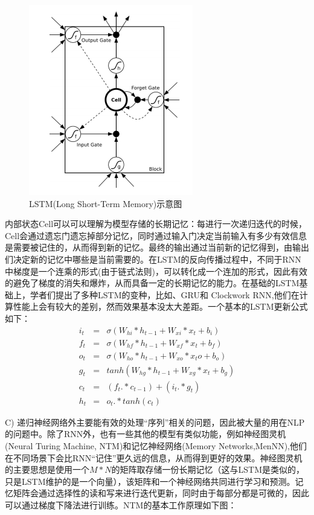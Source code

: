 \begin{figure}[h]
	\centering
	\includegraphics[width=0.3\linewidth]{"fig/LSTM"}
	\caption{LSTM(Long Short-Term Memory)示意图}
	\label{fig:LSTM}
\end{figure}

内部状态Cell可以可以理解为模型存储的长期记忆：每进行一次递归迭代的时候，Cell会通过遗忘门遗忘掉部分记忆，同时通过输入门决定当前输入有多少有效信息是需要被记住的，从而得到新的记忆。最终的输出通过当前新的记忆得到，由输出们决定新的记忆中哪些是当前需要的。在LSTM的反向传播过程中，不同于RNN中梯度是一个连乘的形式(由于链式法则)，可以转化成一个连加的形式，因此有效的避免了梯度的消失和爆炸，从而具备一定的长期记忆的能力。在基础的LSTM基础上，学者们提出了多种LSTM的变种，比如\cite{10}、GRU\cite{11}和 Clockwork RNN\cite{12},他们在计算性能上会有较大的差别，然而效果基本没太大差距\cite{13,14}。一个基本的LSTM更新公式如下：
\begin{eqnarray}
i_t &=& \sigma(W_{hi} * h_{t-1} + W_{xi} * x_t + b_i)
\\
f_t &=& \sigma(W_{hf} * h_{t-1} + W_{xf} * x_t + b_f)
\\
o_t &=& \sigma(W_{ho} * h_{t-1} + W_{xo} * x_to+ b_o)
\\
g_t &=& tanh(W_{hg} * h_{t-1} + W_{xg} * x_t + b_g)
\\
c_t &=& (f_t .* c_{t-1}) + (i_t .* g_t)
\\
h_t &=& o_t .* tanh(c_t)
\end{eqnarray}

C) 递归神经网络外主要能有效的处理“序列”相关的问题，因此被大量的用在NLP的问题中。除了RNN外，也有一些其他的模型有类似功能，例如神经图灵机(Neural Turing Machine, NTM\cite{7})和记忆神经网络(Memory Networks,MenNN\cite{8,9}),他们在不同场景下会比RNN“记住”更久远的信息，从而得到更好的效果。神经图灵机的主要思想是使用一个$M*N$的矩阵取存储一份长期记忆（这与LSTM是类似的，只是LSTM维护的是一个向量），该矩阵和一个神经网络共同进行学习和预测。记忆矩阵会通过选择性的读和写来进行迭代更新，同时由于每部分都是可微的，因此可以通过梯度下降法进行训练。NTM的基本工作原理如下图：

